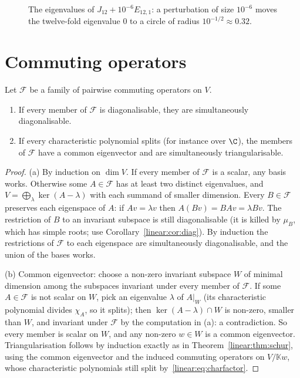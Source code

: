\begin{figure}[ht]
\centering
{}
\caption{The eigenvalues of $J_{12}+10^{-6}E_{12,1}$: a perturbation of size $10^{-6}$ moves the twelve-fold eigenvalue $0$
to a circle of radius $10^{-1/2}\approx0.32$.}
\label{linear:fig:perturb}
\end{figure}

\section{Commuting operators}

\begin{theorem}\label{linear:thm:commuting}
Let $\mathcal F$ be a family of pairwise commuting operators on $V$.
\begin{enumerate}[label=(\alph*)]
\item If every member of $\mathcal F$ is diagonalisable, they are simultaneously diagonalisable.
\item If every characteristic polynomial splits (for instance over $\C$), the members of $\mathcal F$ have a common
eigenvector and are simultaneously triangularisable.
\end{enumerate}
\end{theorem}
\begin{proof}
(a) By induction on $\dim V$. If every member of $\mathcal F$ is a scalar, any basis works. Otherwise some $A\in\mathcal F$
has at least two distinct eigenvalues, and $V=\bigoplus_\lambda\ker(A-\lambda)$ with each summand of smaller dimension. Every
$B\in\mathcal F$ preserves each eigenspace of $A$: if $Av=\lambda v$ then $A(Bv)=BAv=\lambda Bv$. The restriction of $B$ to an
invariant subspace is still diagonalisable (it is killed by $\mu_B$, which has simple roots; use Corollary~\ref{linear:cor:diag}).
By induction the restrictions of $\mathcal F$ to each eigenspace are simultaneously diagonalisable, and the union of the
bases works.

(b) Common eigenvector: choose a non-zero invariant subspace $W$ of minimal dimension among the subspaces invariant under
every member of $\mathcal F$. If some $A\in\mathcal F$ is not scalar on $W$, pick an eigenvalue $\lambda$ of $A|_W$ (its
characteristic polynomial divides $\chi_A$, so it splits); then $\ker(A-\lambda)\cap W$ is non-zero, smaller than $W$, and
invariant under $\mathcal F$ by the computation in (a): a contradiction. So every member is scalar on $W$, and any non-zero
$w\in W$ is a common eigenvector. Triangularisation follows by induction exactly as in Theorem~\ref{linear:thm:schur}, using
the common eigenvector and the induced commuting operators on $V/\mathbb Kw$, whose characteristic polynomials still split
by~\eqref{linear:eq:charfactor}.
\end{proof}

